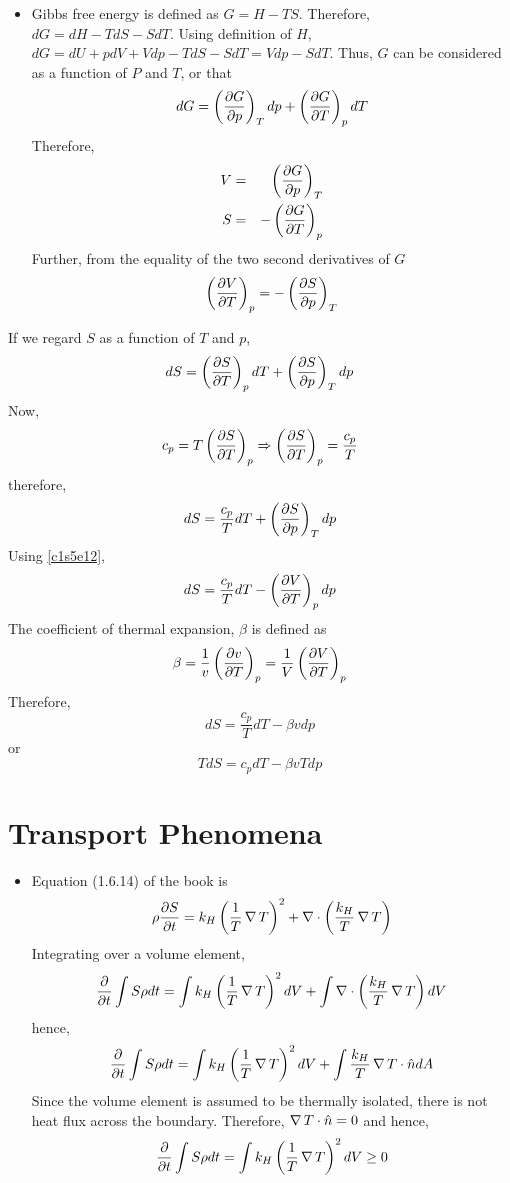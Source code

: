 \begin{itemize}
\item Gibbs free energy is defined as $G = H - TS$. Therefore, $dG = dH - TdS - SdT$. Using definition of $H$, $dG = dU + pdV + Vdp - TdS - SdT = Vdp - SdT$. Thus, $G$ can be considered
as a function of $P$ and $T$, or that
\[
dG = \left(\frac{\partial{G}}{\partial{p}}\right)_T dp + \left(\frac{\partial{G}}{\partial{T}}\right)_p dT
\]
Therefore,
\begin{eqnarray}
V &=& \left(\frac{\partial{G}}{\partial{p}}\right)_T \label{c1s5e10} \\
S &=& -\left(\frac{\partial{G}}{\partial{T}}\right)_p \label{c1s5e11} 
\end{eqnarray}
Further, from the equality of the two second derivatives of $G$ 
\begin{equation}\label{c1s5e12}
\left(\frac{\partial{V}}{\partial{T}}\right)_p = -\left(\frac{\partial{S}}{\partial{p}}\right)_T
\end{equation}
\end{itemize}
If we regard $S$ as a function of $T$ and $p$,
\[
dS = \left(\frac{\partial{S}}{\partial{T}}\right)_p dT + \left(\frac{\partial{S}}{\partial{p}}\right)_T dp
\]
Now,
\[
c_p = T\left(\frac{\partial{S}}{\partial{T}}\right)_p \Rightarrow \left(\frac{\partial{S}}{\partial{T}}\right)_p = \frac{c_p}{T}
\]
therefore,
\[
dS = \frac{c_p}{T}dT + \left(\frac{\partial{S}}{\partial{p}}\right)_T dp
\]
Using \eqref{c1s5e12},
\[
dS = \frac{c_p}{T}dT - \left(\frac{\partial{V}}{\partial{T}}\right)_p dp
\]
The coefficient of thermal expansion, $\beta$ is defined as
\[
\beta = \frac{1}{v}\left(\frac{\partial{v}}{\partial{T}}\right)_p = \frac{1}{V}\left(\frac{\partial{V}}{\partial{T}}\right)_p
\]
Therefore,
\[
dS = \frac{c_p}{T}dT - \beta v dp
\]
or
\begin{equation}\label{c1s5e13}
TdS = c_p dT - \beta vT dp
\end{equation}

\section{Transport Phenomena}\label{c1s6}
\begin{itemize}
\item Equation (1.6.14) of the book is
\[
\rho\frac{\partial{S}}{\partial{t}} = k_H\left(\frac{1}{T}\operatorname{\nabla}{T}\right)^2 + \nabla\cdot\left(\frac{k_H}{T}\operatorname{\nabla}{T}\right)
\]
Integrating over a volume element,
\[
\frac{\partial}{\partial t}\int S\rho dt = \int k_H\left(\frac{1}{T}\operatorname{\nabla}{T}\right)^2dV + \int \nabla\cdot\left(\frac{k_H}{T}\operatorname{\nabla}{T}\right)dV
\]
hence,
\[
\frac{\partial}{\partial t}\int S\rho dt = \int k_H\left(\frac{1}{T}\operatorname{\nabla}{T}\right)^2dV + \int \frac{k_H}{T}\operatorname{\nabla}{T}\cdot\hat{n} dA
\]
Since the volume element is assumed to be thermally isolated, there is not heat flux across the boundary. Therefore, $\operatorname{\nabla}{T}\cdot\hat{n} = 0$ and hence,
\[
\frac{\partial}{\partial t}\int S\rho dt = \int k_H\left(\frac{1}{T}\operatorname{\nabla}{T}\right)^2dV \ge 0
\]
\end{itemize}

